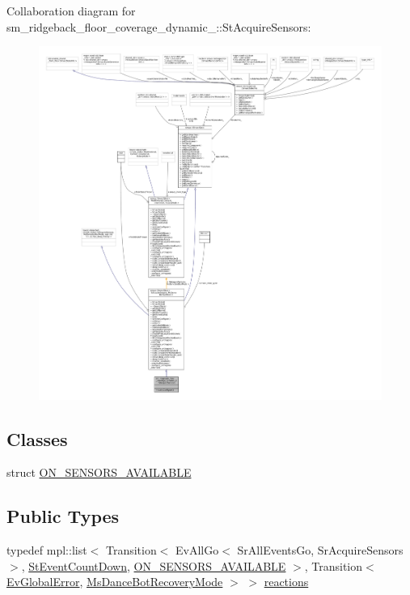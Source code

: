 Collaboration diagram for sm\+\_\+ridgeback\+\_\+floor\+\_\+coverage\+\_\+dynamic\+\_\+:\+:St\+Acquire\+Sensors\+:
\nopagebreak
\begin{figure}[H]
\begin{center}
\leavevmode
\includegraphics[width=350pt]{structsm__ridgeback__floor__coverage__dynamic__1_1_1StAcquireSensors__coll__graph}
\end{center}
\end{figure}
\subsection*{Classes}
\begin{DoxyCompactItemize}
\item 
struct \hyperlink{structsm__ridgeback__floor__coverage__dynamic__1_1_1StAcquireSensors_1_1ON__SENSORS__AVAILABLE}{O\+N\+\_\+\+S\+E\+N\+S\+O\+R\+S\+\_\+\+A\+V\+A\+I\+L\+A\+B\+LE}
\end{DoxyCompactItemize}
\subsection*{Public Types}
\begin{DoxyCompactItemize}
\item 
typedef mpl\+::list$<$ Transition$<$ Ev\+All\+Go$<$ Sr\+All\+Events\+Go, Sr\+Acquire\+Sensors $>$, \hyperlink{structsm__ridgeback__floor__coverage__dynamic__1_1_1StEventCountDown}{St\+Event\+Count\+Down}, \hyperlink{structsm__ridgeback__floor__coverage__dynamic__1_1_1StAcquireSensors_1_1ON__SENSORS__AVAILABLE}{O\+N\+\_\+\+S\+E\+N\+S\+O\+R\+S\+\_\+\+A\+V\+A\+I\+L\+A\+B\+LE} $>$, Transition$<$ \hyperlink{structsm__ridgeback__floor__coverage__dynamic__1_1_1EvGlobalError}{Ev\+Global\+Error}, \hyperlink{classsm__ridgeback__floor__coverage__dynamic__1_1_1MsDanceBotRecoveryMode}{Ms\+Dance\+Bot\+Recovery\+Mode} $>$ $>$ \hyperlink{structsm__ridgeback__floor__coverage__dynamic__1_1_1StAcquireSensors_af1276672402d621a5e270a48d5f79586}{reactions}
\end{DoxyCompactItemize}
